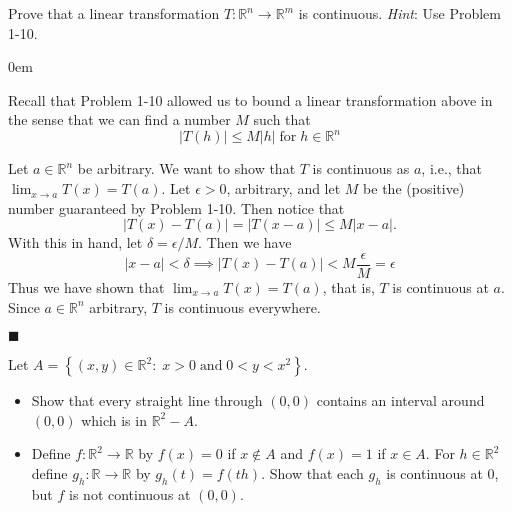 \documentclass[12pt]{article}
\renewcommand{\qed}{\hfill$\blacksquare$}
\renewenvironment{proof}{\begin{addmargin}[1em]{0em}\begin{newproof}}{\end{newproof}\end{addmargin}\qed}
\newenvironment{problem}[2][Problem]{\begin{trivlist}
\item[\hskip \labelsep {\bfseries #1}\hskip \labelsep {\bfseries #2.}]}{\end{trivlist}}
\begin{document}
 
\begin{problem}{1.25}
 Prove that a linear transformation $T:\mathbb{R}^n\rightarrow \mathbb{R}^m$ is continuous. \textit{Hint}: Use Problem 1-10.
\end{problem}

 \begin{proof}
 Recall that Problem 1-10 allowed us to bound a linear transformation above in the sense that we can find a number $M$ such that 
 $$ \left|T\left(h\right)\right| \leq M \left| h\right| \; \text{for} \; h \in \mathbb{R}^n$$
 
Let $a\in \mathbb{R}^n$ be arbitrary. We want to show that $T$ is continuous as $a$, i.e., that $\lim_{x\rightarrow a} T\left(x\right) = T\left(a\right)$. Let $\epsilon > 0$, arbitrary, and let $M$ be the (positive) number guaranteed by Problem 1-10. Then notice that
$$ \left| T\left(x\right) - T\left(a\right) \right| = \left| T\left(x-a\right)\right| \leq M \left|x-a\right|.$$ With this in hand, let $\delta = \epsilon / M$. Then we have 
$$ \left|x-a\right| < \delta \implies \left|T\left(x\right) - T\left(a\right)\right| < M \frac{\epsilon}{M} = \epsilon $$
Thus we have shown that $\lim_{x\rightarrow a} T\left(x\right) = T\left(a\right)$, that is, $T$ is continuous at $a$. Since $a\in \mathbb{R}^n$ arbitrary, $T$ is continuous everywhere.
 \end{proof}
 
 
 
 \begin{problem}{1.26}
 Let $A = \left\{ \left(x,y\right) \in \mathbb{R}^2: \; x>0 \; \text{and} \; 0<y<x^2 \right\}$.
 \begin{itemize}
 	\item Show that every straight line through $\left(0,0\right)$ contains an interval around $\left(0,0\right)$ which is in $\mathbb{R}^2-A$. \\
 	\item Define $f: \mathbb{R}^2\rightarrow \mathbb{R}$ by $f\left(x\right)=0$ if $x \notin A$ and $f\left(x\right)=1$ if $x\in A$. For $h\in \mathbb{R}^2$ define $g_h: \mathbb{R}\rightarrow \mathbb{R}$ by $g_h\left(t\right) = f\left(th\right)$. Show that each $g_h$ is continuous at $0$, but $f$ is not continuous at $\left(0,0\right)$.
 \end{itemize}
 \end{problem}
 
\end{document}
